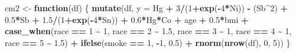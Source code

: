 \documentclass[12pt, twoside]{amherstthesis}
\newenvironment{Shaded}{\begin{snugshade}}{\end{snugshade}}
\newcommand{\AttributeTok}[1]{\textcolor[rgb]{0.13,0.29,0.53}{#1}}
\newcommand{\ControlFlowTok}[1]{\textcolor[rgb]{0.13,0.29,0.53}{\textbf{#1}}}
\newcommand{\DecValTok}[1]{\textcolor[rgb]{0.00,0.00,0.81}{#1}}
\newcommand{\FloatTok}[1]{\textcolor[rgb]{0.00,0.00,0.81}{#1}}
\newcommand{\FunctionTok}[1]{\textcolor[rgb]{0.13,0.29,0.53}{\textbf{#1}}}
\newcommand{\NormalTok}[1]{#1}
\newcommand{\OtherTok}[1]{\textcolor[rgb]{0.56,0.35,0.01}{#1}}
\newcommand{\SpecialCharTok}[1]{\textcolor[rgb]{0.81,0.36,0.00}{\textbf{#1}}}
\begin{document}
\begin{Shaded}
\begin{Highlighting}[]
\NormalTok{cm2 }\OtherTok{\textless{}{-}} \ControlFlowTok{function}\NormalTok{(df) \{}
  \FunctionTok{mutate}\NormalTok{(df, }\AttributeTok{y =} 
\NormalTok{           Hg }\SpecialCharTok{+} \DecValTok{3}\SpecialCharTok{/}\NormalTok{(}\DecValTok{1}\SpecialCharTok{+}\FunctionTok{exp}\NormalTok{(}\SpecialCharTok{{-}}\DecValTok{4}\SpecialCharTok{*}\NormalTok{Ni)) }\SpecialCharTok{{-}}\NormalTok{ (Sb}\SpecialCharTok{\^{}}\DecValTok{2}\NormalTok{) }\SpecialCharTok{+} \FloatTok{0.5}\SpecialCharTok{*}\NormalTok{Sb }\SpecialCharTok{+} \FloatTok{1.5}\SpecialCharTok{/}\NormalTok{(}\DecValTok{1}\SpecialCharTok{+}\FunctionTok{exp}\NormalTok{(}\SpecialCharTok{{-}}\DecValTok{4}\SpecialCharTok{*}\NormalTok{Sn)) }\SpecialCharTok{+} 
           \FloatTok{0.6}\SpecialCharTok{*}\NormalTok{Hg}\SpecialCharTok{*}\NormalTok{Co }\SpecialCharTok{+} 
\NormalTok{           age }\SpecialCharTok{+} \FloatTok{0.5}\SpecialCharTok{*}\NormalTok{bmi }\SpecialCharTok{+} 
           \FunctionTok{case\_when}\NormalTok{(race }\SpecialCharTok{==} \DecValTok{1} \SpecialCharTok{\textasciitilde{}} \DecValTok{1}\NormalTok{, }
\NormalTok{                     race }\SpecialCharTok{==} \DecValTok{2} \SpecialCharTok{\textasciitilde{}} \FloatTok{1.5}\NormalTok{, }
\NormalTok{                     race }\SpecialCharTok{==} \DecValTok{3} \SpecialCharTok{\textasciitilde{}} \DecValTok{1}\NormalTok{, }
\NormalTok{                     race }\SpecialCharTok{==} \DecValTok{4} \SpecialCharTok{\textasciitilde{}} \DecValTok{1}\NormalTok{, }
\NormalTok{                     race }\SpecialCharTok{==} \DecValTok{5} \SpecialCharTok{\textasciitilde{}} \FloatTok{1.5}\NormalTok{) }\SpecialCharTok{+}
           \FunctionTok{ifelse}\NormalTok{(smoke }\SpecialCharTok{==} \DecValTok{1}\NormalTok{, }\SpecialCharTok{{-}}\DecValTok{1}\NormalTok{, }\FloatTok{0.5}\NormalTok{) }\SpecialCharTok{+}
           \FunctionTok{rnorm}\NormalTok{(}\FunctionTok{nrow}\NormalTok{(df), }\DecValTok{0}\NormalTok{, }\DecValTok{5}\NormalTok{))}
\NormalTok{\}}


\end{Highlighting}
\end{Shaded}
\end{document}
